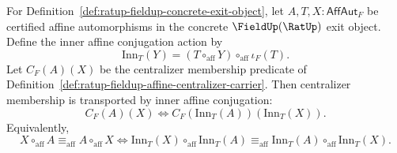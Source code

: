 \begin{theorem}
\label{thm:ratup-fieldup-affine-centralizer-conjugation-equivariance}
For Definition~\ref{def:ratup-fieldup-concrete-exit-object}, let
$A,T,X:\mathsf{AffAut}_F$ be certified affine automorphisms in the concrete
$\FieldUp(\RatUp)$ exit object. Define the inner affine conjugation action by
$$
\mathrm{Inn}_T(Y)=(T\circ_{\mathrm{aff}}Y)\circ_{\mathrm{aff}}\iota_F(T).
$$
Let $C_F(A)(X)$ be the centralizer membership predicate of
Definition~\ref{def:ratup-fieldup-affine-centralizer-carrier}. Then
centralizer membership is transported by inner affine conjugation:
$$
C_F(A)(X)
\Longleftrightarrow
C_F(\mathrm{Inn}_T(A))(\mathrm{Inn}_T(X)).
$$
Equivalently,
$$
X\circ_{\mathrm{aff}}A\equiv_{\mathrm{aff}}A\circ_{\mathrm{aff}}X
\Longleftrightarrow
\mathrm{Inn}_T(X)\circ_{\mathrm{aff}}\mathrm{Inn}_T(A)
\equiv_{\mathrm{aff}}
\mathrm{Inn}_T(A)\circ_{\mathrm{aff}}\mathrm{Inn}_T(X).
$$
\end{theorem}
